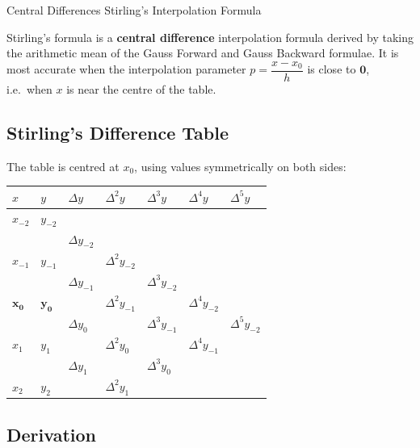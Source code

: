 \documentclass[12pt]{article}
\newcommand{\hcell}[1]{\textbf{\color{white}#1}}
\begin{document}
\begin{methodtitle}{Central Differences}{}
  Stirling's Interpolation Formula
\end{methodtitle}

\begin{defbox}
Stirling's formula is a \textbf{central difference} interpolation formula derived by taking the arithmetic mean of the Gauss Forward and Gauss Backward formulae. It is most accurate when the interpolation parameter $p = \dfrac{x - x_0}{h}$ is close to $\mathbf{0}$, i.e.\ when $x$ is near the centre of the table.
\end{defbox}

\subsection*{Stirling's Difference Table}

The table is centred at $x_0$, using values symmetrically on both sides:

\begin{center}
\renewcommand{\arraystretch}{1.45}
\begin{tabular}{C{1.4cm} C{1.4cm} C{1.8cm} C{1.8cm} C{1.8cm} C{1.8cm} C{1.8cm}}
\toprule
{}
\hcell{$x$} & \hcell{$y$} & \hcell{$\Delta y$} & \hcell{$\Delta^2 y$} & \hcell{$\Delta^3 y$} & \hcell{$\Delta^4 y$} & \hcell{$\Delta^5 y$} \\
\midrule
$x_{-2}$ & $y_{-2}$ & & & & & \\
 & & $\Delta y_{-2}$ & & & & \\
$x_{-1}$ & $y_{-1}$ & & $\Delta^2 y_{-2}$ & & & \\
 & & $\Delta y_{-1}$ & & $\Delta^3 y_{-2}$ & & \\
$\boldsymbol{x_0}$ & $\boldsymbol{y_0}$ & & $\Delta^2 y_{-1}$ & & $\Delta^4 y_{-2}$ & \\
 & & $\Delta y_0$ & & $\Delta^3 y_{-1}$ & & $\Delta^5 y_{-2}$ \\
$x_1$ & $y_1$ & & $\Delta^2 y_0$ & & $\Delta^4 y_{-1}$ & \\
 & & $\Delta y_1$ & & $\Delta^3 y_0$ & & \\
$x_2$ & $y_2$ & & $\Delta^2 y_1$ & & & \\
\bottomrule
\end{tabular}
\end{center}

\subsection*{Derivation}
\end{document}
